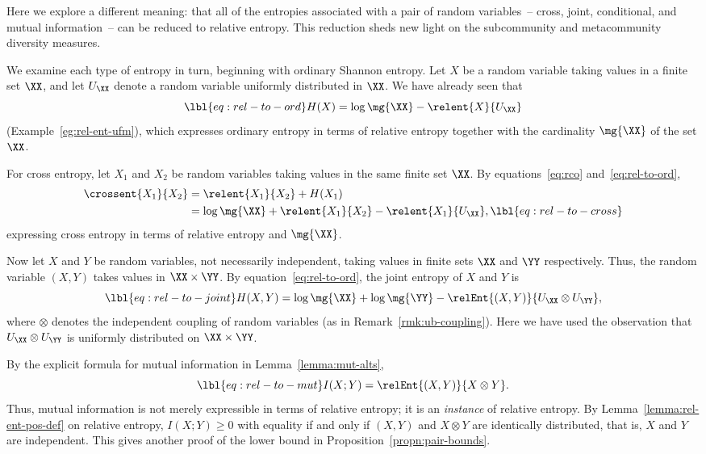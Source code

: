 Here we explore a different meaning: that all of the entropies associated
with a pair of random variables~-- cross, joint, conditional, and mutual
information~-- can be reduced to relative entropy.  This reduction sheds new
light on the subcommunity and metacommunity diversity measures.

We examine each type of entropy in turn, beginning with ordinary Shannon
entropy.  Let $X$ be a random variable taking values in a finite set $\XX$,
and let $U_{\XX}$ denote a random variable uniformly distributed
in $\XX$.  We have already seen that
% 
\begin{equation}
\lbl{eq:rel-to-ord}
H(X) = \log\mg{\XX} - \relent{X}{U_{\XX}}
\end{equation}
% 
(Example~\ref{eg:rel-ent-ufm}), which expresses ordinary entropy in terms
of relative entropy together with the cardinality $\mg{\XX}$ of the set $\XX$.

For cross%
%
% 
entropy, let $X_1$ and $X_2$ be random variables taking values in the same
finite set $\XX$.  By equations~\eqref{eq:rco} and~\eqref{eq:rel-to-ord},
% 
\begin{align}
\crossent{X_1}{X_2}     &
=
\relent{X_1}{X_2} + H(X_1)      
\nonumber       \\
&
=
\log\mg{\XX} + \relent{X_1}{X_2} - \relent{X_1}{U_{\XX}},
\lbl{eq:rel-to-cross}
\end{align}
% 
expressing cross entropy in terms of relative entropy and $\mg{\XX}$. 

Now let $X$ and $Y$ be random variables, not necessarily independent,
taking values in finite sets $\XX$ and $\YY$ respectively.  Thus, the
random variable $(X, Y)$ takes values in $\XX \times \YY$.  By
equation~\eqref{eq:rel-to-ord}, the joint%
%
% 
entropy of $X$ and $Y$ is
% 
\begin{equation}
\lbl{eq:rel-to-joint}
H(X, Y) 
=
\log\mg{\XX} + \log\mg{\YY} - \relEnt{(X, Y)}{U_{\XX} \otimes U_{\YY}},
\end{equation}
% 
where $\otimes$ denotes the independent coupling of random variables (as in
Remark~\ref{rmk:ub-coupling}).  Here we have used the observation that
$U_{\XX} \otimes U_{\YY}$ is uniformly distributed on $\XX \times \YY$.

By the explicit formula for mutual%
%
% 
information in Lemma~\ref{lemma:mut-alts},
% 
\begin{equation}
\lbl{eq:rel-to-mut}
I(X; Y) = \relEnt{(X, Y)}{X \otimes Y}.
\end{equation}
% 
Thus, mutual information is not merely expressible in terms of relative
entropy; it is an \emph{instance} of relative entropy.  By
Lemma~\ref{lemma:rel-ent-pos-def} on relative entropy, $I(X; Y) \geq 0$
with equality if and only if $(X, Y)$ and $X \otimes Y$ are identically
distributed, that is, $X$ and $Y$ are independent.  This gives another
proof of the lower bound in
Proposition~\ref{propn:pair-bounds}.

